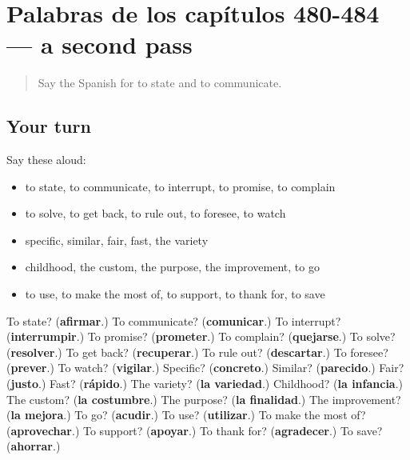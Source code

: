 \section[(dialogue)]{Palabras de los capítulos 480-484 — a second pass}

\label{lesson:ES-R484-repaso-palabras-de-los-capitulos-480-484}



\begin{quote}
Say the Spanish for to state and to communicate.
\end{quote}

\subsection*{Your turn}
Say these aloud:

\begin{itemize}
\raggedright
  \item to state, to communicate, to interrupt, to promise, to complain
  \item to solve, to get back, to rule out, to foresee, to watch
  \item specific, similar, fair, fast, the variety
  \item childhood, the custom, the purpose, the improvement, to go
  \item to use, to make the most of, to support, to thank for, to save
\end{itemize}

\begin{tcolorbox}[breakable,colback=teal!4,colframe=teal!35!black,title={Before you move on}]
To state? (\textbf{afirmar}.) To communicate? (\textbf{comunicar}.) To interrupt? (\textbf{interrumpir}.) To promise? (\textbf{prometer}.) To complain? (\textbf{quejarse}.) To solve? (\textbf{resolver}.) To get back? (\textbf{recuperar}.) To rule out? (\textbf{descartar}.) To foresee? (\textbf{prever}.) To watch? (\textbf{vigilar}.) Specific? (\textbf{concreto}.) Similar? (\textbf{parecido}.) Fair? (\textbf{justo}.) Fast? (\textbf{rápido}.) The variety? (\textbf{la variedad}.) Childhood? (\textbf{la infancia}.) The custom? (\textbf{la costumbre}.) The purpose? (\textbf{la finalidad}.) The improvement? (\textbf{la mejora}.) To go? (\textbf{acudir}.) To use? (\textbf{utilizar}.) To make the most of? (\textbf{aprovechar}.) To support? (\textbf{apoyar}.) To thank for? (\textbf{agradecer}.) To save? (\textbf{ahorrar}.)
\end{tcolorbox}
